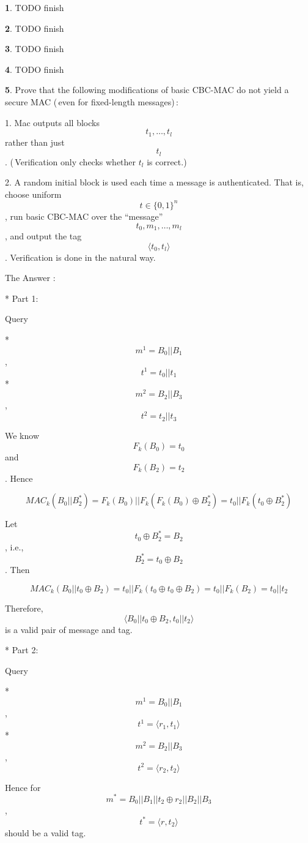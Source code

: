 \documentclass{article}
\theoremstyle{definition}
\theoremstyle{definition}
\theoremstyle{definition}
\newtheorem{solution-internal}{}[subsection]
\newenvironment{solution}{
  \begin{solution-internal}
}{
  \end{solution-internal}
}
\begin{document}
\begin{solution}
  TODO finish
\end{solution}
\begin{solution}
  TODO finish
\end{solution}
\begin{solution}
  TODO finish
\end{solution}
\begin{solution}
  TODO finish
\end{solution}
\begin{solution}
  Prove that the following modifications of basic CBC-MAC do not yield a secure MAC (\,even for fixed-length messages)\,:

1. Mac outputs all blocks $$t_1, \ldots , t_l$$rather than just $$t_l$$. (\,Verification only checks whether $t_l$ is correct.)\,

2. A random initial block is used each time a message is authenticated. That is, choose uniform $$t \in \{0, 1\}^n$$, run basic CBC-MAC over the “message” $$t_0,m_1, \ldots ,m_l$$, and output the tag $$ \langle t_0, t_l \rangle$$. Verification is done in the natural way.

The Answer :

* Part 1:

Query

* $$m^1 = B_0 || B_1$$, $$t^1 = t_0 || t_1$$
* $$m^2 = B_2 || B_3$$, $$t^2 = t_2||t_3$$

We know $$F_k(B_0) = t_0$$ and $$F_k(B_2) = t_2$$. Hence 

$$
MAC_k(B_0 || B^*_2) = F_k(B_0) || F_k(F_k(B_0) \oplus B^*_2) = t_0 || F_k(t_0 \oplus B^*_2)
$$

Let $$t_0 \oplus B^*_2 = B_2$$, i.e., $$B^*_2 = t_0 \oplus B_2$$. Then

$$
MAC_k(B_0 || t_0 \oplus B_2) = t_0 || F_k(t_0 \oplus t_0 \oplus B_2) = t_0 || F_k(B_2) = t_0 || t_2
$$

Therefore, $$\langle B_0 || t_0 \oplus B_2, t_0 || t_2 \rangle$$ is a valid pair of message and tag.

* Part 2:

Query

* $$m^1 = B_0 || B_1$$, $$t^1 = \langle r_1, t_1 \rangle$$
* $$ m^2 = B_2 || B_3 $$, $$ t^2 = \langle r_2, t_2 \rangle $$

Hence for $$m^* = B_0 || B_1 || t_2 \oplus r_2 || B_2 || B_3 $$, $$ t^* = \langle r, t_2 \rangle$$ should be a valid tag.

\end{solution}
\end{document}
